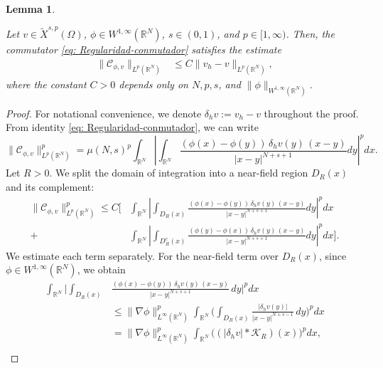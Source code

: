 \documentclass[]{amsart}
\newtheorem{Lemma}[theorem]{Lemma}
\theoremstyle{definition}
\theoremstyle{definition}
\theoremstyle{remark}
\numberwithin{equation}{section}
\newcommand{\mus}{\mu(N, s)}
\begin{document}
\begin{Lemma}
	\label{Regularidad: Cota conmutador}
 
 Let \( v \in \widetilde{X}^{s,p}(\Omega) \), \( \phi \in W^{1,\infty}(\mathbb{R}^N) \), \( s \in (0,1) \), and \( p \in [1, \infty) \). Then, the commutator \eqref{eq: Regularidad-conmutador} satisfies the estimate
	\begin{align}
		\label{Regularidad: Teorema de regularidad F_2 Cota conmutador con norma Lp}
\|\mathcal{C}_{\phi,v}\|_{L^p(\mathbb{R}^N)} &\leq C  \| v_h-v \|_{L^{p}(\mathbb{R}^N)} ,
	\end{align}
	where the constant \( C > 0 \) depends only on \( N, p, s \), and \( \|\phi\|_{W^{1,\infty}(\mathbb{R}^N)} \).
\end{Lemma}

\begin{proof} 
For notational convenience, we denote $\delta_h v := v_h - v$ throughout the proof. 
	From identity \eqref{eq: Regularidad-conmutador}, we can write
	\[
\|\mathcal{C}_{\phi,v}\|^p_{L^p(\mathbb{R}^N)}= \mus^p\int_{\mathbb{R}^N} \left|\int_{\mathbb{R}^N} \frac{(\phi(x)-\phi(y))\, \delta_h v(y) \, (x-y)}{|x-y|^{N+s+1}} dy\right|^p dx.
	\]	
	Let \( R > 0 \). We split the domain of integration into a near-field region \( D_R(x) \) and its complement:
	\begin{align*}
\|\mathcal{C}_{\phi,v}\|^p_{L^p(\mathbb{R}^N)} \leq C\bigg[&\int_{\mathbb{R}^N} \left|\int_{D_R(x)} \frac{(\phi(x)-\phi(y))\, \delta_h v(y) \,(x-y)}{|x-y|^{N+s+1}} dy\right|^p dx \\
		+ &\int_{\mathbb{R}^N} \left|\int_{D^c_R(x)} \frac{(\phi(y)-\phi(x))\, \delta_h v(y) \,(x-y)}{|x-y|^{N+s+1}} dy\right|^p dx\bigg].
	\end{align*}
	We estimate each term separately. For the near-field term over \( D_R(x) \), 
    since \( \phi \in W^{1,\infty}(\mathbb{R}^N) \), we 
    obtain 
	\begin{align}
\int_{\mathbb{R}^N} \Bigg|\int_{D_R(x)} 
&\frac{(\phi(x)-\phi(y))\, \delta_h v(y) \,(x-y)}{|x-y|^{N+s+1}}\,dy\Bigg|^p dx \\
&\leq \|\nabla \phi \|^{p}_{L^{\infty}(\mathbb{R}^N)} \int_{\mathbb{R}^N} \Bigg(\int_{D_R(x)} \frac{| \delta_h v(y)|}{|x-y|^{N+s-1}}\,dy\Bigg)^p dx \\
& = \|\nabla \phi \|^{p}_{L^{\infty}(\mathbb{R}^N)} \int_{\mathbb{R}^N} \Big( (|\delta_h v| \ast \mathcal{K}_R)(x)\Big)^p dx,\\
\end{align}

\end{proof}
\end{document}
